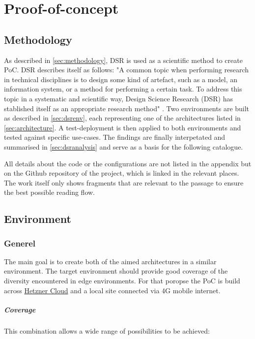 \documentclass[MSC,Master,english]{twbook}%
\begin{document}
\chapter{Proof-of-concept}
\label{chap:dsr}


\section{Methodology}
\label{sec:dsrmethode}
As described in \autoref{sec:methodology}, \ac{DSR} is used as a scientific method to create \ac{PoC}. \ac{DSR} describes itself as follows: "A common topic when performing research in technical disciplines is to design some kind of artefact, such as a model, an information system, or a method for performing a certain task. To address this topic in a systematic and scientific way, Design Science Research (DSR) has stablished itself as an appropriate research method" \cite{dsr-method}. Two environments are built as described in \autoref{sec:dsrenv}, each representing one of the architectures listed in \autoref{sec:architecture}. A test-deployment is then applied to both environments and tested against specific use-cases. The findings are finally interpetated and summarised in \autoref{sec:dsranalysis} and serve as a basis for the following catalogue.\par

All details about the code or the configurations are not listed in the appendix but on the Github repository\cite{bk-gh-repo} of the project, which is linked in the relevant places. The work itself only shows fragments that are relevant to the passage to ensure the best possible reading flow.

\section{Environment}
\label{sec:dsrenv}
\subsection{Generel}
The main goal is to create both of the aimed architectures in a similar environment. The target environment should provide good coverage of the diversity encountered in edge environments. For that poropse the \ac{PoC} is build across \hyperref{https://www.hetzner.com/cloud}{}{}{Hetzner Cloud}\cite{hetzner-cloud} and a local site connected via 4G mobile internet.

\paragraph{Coverage} This combination allows a wide range of possibilities to be achieved:
\end{document}
